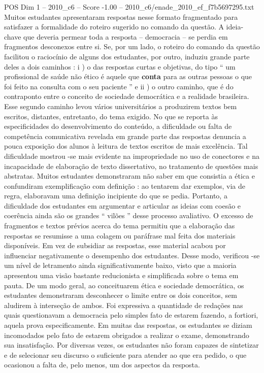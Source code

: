 \begin{textsample}{POS Dim 1 – 2010\_c6 – Score -1.00 – 2010\_c6/enade\_2010\_ef\_f7b5697295.txt}
Muitos estudantes apresentaram respostas nesse formato fragmentado para satisfazer a formalidade do roteiro sugerido no comando da questão.
A ideia-chave que deveria permear toda a resposta – democracia – se perdia em fragmentos desconexos entre si.
Se, por um lado, o roteiro do comando da questão facilitou o raciocínio de alguns dos estudantes, por outro, induziu grande parte deles a dois caminhos : i ) o das respostas curtas e objetivas, do tipo “ um profissional de saúde não ético é aquele que \textbf{conta} para as outras pessoas o que foi feito na consulta com o seu paciente ” e ii ) o outro caminho, que é do contraponto entre o conceito de sociedade democrática e a realidade brasileira.
Esse segundo caminho levou vários universitários a produzirem textos bem escritos, distantes, entretanto, do tema exigido.
No que se reporta às especificidades do desenvolvimento do conteúdo, a dificuldade ou falta de competência comunicativa revelada em grande parte das respostas denuncia a pouca exposição dos alunos à leitura de textos escritos de mais excelência.
Tal dificuldade mostrou -se mais evidente na impropriedade no uso de conectores e na incapacidade de elaboração de texto dissertativo, no tratamento de questões mais abstratas.
Muitos estudantes demonstraram não saber em que consistia a ética e confundiram exemplificação com definição : ao tentarem dar exemplos, via de regra, elaboravam uma definição incipiente do que se pedia.
Portanto, a dificuldade dos estudantes em argumentar e articular as ideias com coesão e coerência ainda são os grandes “ vilões ” desse processo avaliativo.
O excesso de fragmentos e textos prévios acerca do tema permitiu que a elaboração das respostas se resumisse a uma colagem ou paráfrase mal feita dos materiais disponíveis.
Em vez de subsidiar as respostas, esse material acabou por influenciar negativamente o desempenho dos estudantes.
Desse modo, verificou -se um nível de letramento ainda significativamente baixo, visto que a maioria apresentou uma visão bastante reducionista e simplificada sobre o tema em pauta.
De um modo geral, ao conceituarem ética e sociedade democrática, os estudantes demonstraram desconhecer o limite entre os dois conceitos, sem aludirem à interseção de ambos.
Foi expressiva a quantidade de redações nas quais questionavam a democracia pelo simples fato de estarem fazendo, a fortiori, aquela prova especificamente.
Em muitas das respostas, os estudantes se diziam incomodados pelo fato de estarem obrigados a realizar o exame, demonstrando sua insatisfação.
Por diversas vezes, os estudantes não foram capazes de sintetizar e de selecionar seu discurso o suficiente para atender ao que era pedido, o que ocasionou a falta de, pelo menos, um dos aspectos da resposta.

\end{textsample}
